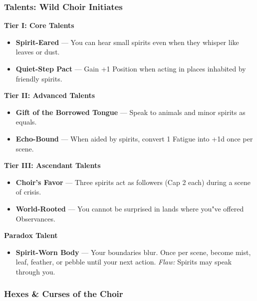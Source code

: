 \documentclass[11pt]{book}
\begin{document}
    \subsubsection*{Talents: Wild Choir Initiates}
    \begin{tcolorbox}[colback=mistgray!10,colframe=deepgreen,title={Wild Choir --- Talents}]
    
    \textbf{Tier I: Core Talents}
    \begin{itemize}[noitemsep]
      \item \textbf{Spirit-Eared} --- You can hear small spirits even when they whisper like leaves or dust.
      \item \textbf{Quiet-Step Pact} --- Gain +1 Position when acting in places inhabited by friendly spirits.
    \end{itemize}
    
    \textbf{Tier II: Advanced Talents}
    \begin{itemize}[noitemsep]
      \item \textbf{Gift of the Borrowed Tongue} --- Speak to animals and minor spirits as equals.
      \item \textbf{Echo-Bound} --- When aided by spirits, convert 1 Fatigue into +1d once per scene.
    \end{itemize}
    
    \textbf{Tier III: Ascendant Talents}
    \begin{itemize}[noitemsep]
      \item \textbf{Choir's Favor} --- Three spirits act as followers (Cap 2 each) during a scene of crisis.
      \item \textbf{World-Rooted} --- You cannot be surprised in lands where you"ve offered Observances.
    \end{itemize}
    
    \textbf{Paradox Talent}
    \begin{itemize}[noitemsep]
      \item \textbf{Spirit-Worn Body} --- Your boundaries blur.  
      Once per scene, become mist, leaf, feather, or pebble until your next action.  
      \emph{Flaw:} Spirits may speak through you.
    \end{itemize}
    
    \end{tcolorbox}
    
    \subsubsection*{Hexes \& Curses of the Choir}
    
\end{document}
